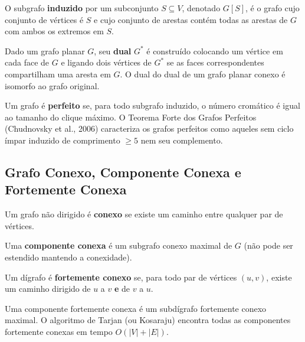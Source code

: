 \documentclass[12pt,a4paper]{article}
\begin{document}
\begin{description}[leftmargin=0pt]
  \item[Grafo Induzido] O subgrafo \textbf{induzido} por um subconjunto $S \subseteq V$, denotado $G[S]$, é o grafo cujo conjunto de vértices é $S$ e cujo conjunto de arestas contém todas as arestas de $G$ com ambos os extremos em $S$.

  \item[Grafo Dual] Dado um grafo planar $G$, seu \textbf{dual} $G^*$ é construído colocando um vértice em cada face de $G$ e ligando dois vértices de $G^*$ se as faces correspondentes compartilham uma aresta em $G$. O dual do dual de um grafo planar conexo é isomorfo ao grafo original.

  \item[Grafo Perfeito] Um grafo é \textbf{perfeito} se, para todo subgrafo induzido, o número cromático é igual ao tamanho do clique máximo. O Teorema Forte dos Grafos Perfeitos (Chudnovsky et al., 2006) caracteriza os grafos perfeitos como aqueles sem ciclo ímpar induzido de comprimento $\geq 5$ nem seu complemento.
\end{description}

\subsection{Grafo Conexo, Componente Conexa e Fortemente Conexa}

\begin{description}[leftmargin=0pt]
  \item[Grafo Conexo] Um grafo não dirigido é \textbf{conexo} se existe um caminho entre qualquer par de vértices.

  \item[Componente Conexa] Uma \textbf{componente conexa} é um subgrafo conexo maximal de $G$ (não pode ser estendido mantendo a conexidade).

  \item[Grafo Fortemente Conexo] Um dígrafo é \textbf{fortemente conexo} se, para todo par de vértices $(u,v)$, existe um caminho dirigido de $u$ a $v$ \textbf{e} de $v$ a $u$.

  \item[Componente Fortemente Conexa] Uma componente fortemente conexa é um subdígrafo fortemente conexo maximal. O algoritmo de Tarjan (ou Kosaraju) encontra todas as componentes fortemente conexas em tempo $O(|V|+|E|)$.
\end{description}
\end{document}
